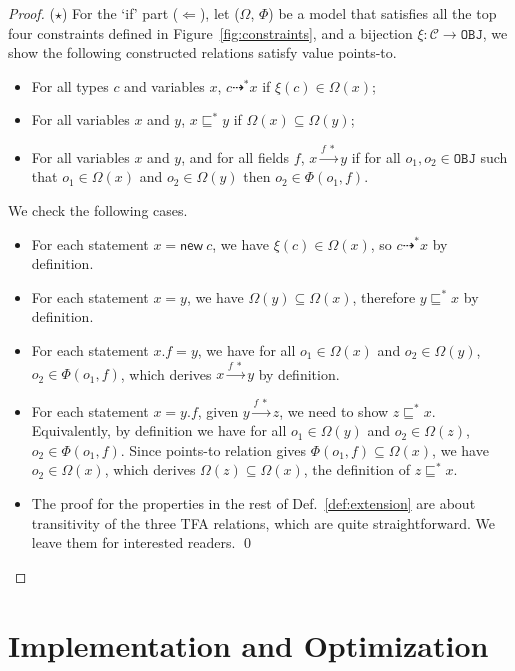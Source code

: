 \documentclass{llncs}
\newcommand{\keyword}[1]{\mathsf{#1}}
\newcommand{\kwnew}[0]{\keyword{new}}
\newcommand\Obj{\mathtt{OBJ}}
\newcommand{\VPT}{\Omega}
\newcommand{\HPT}{\Phi}
\newcommand{\Class}{\mathcal{C}}
\newcommand{\less}{\sqsubseteq}
\newcommand{\tflow}{\dashrightarrow}
\newcommand{\hflow}{\longrightarrow}
\newcommand{\lhflow}[1]{\stackrel{#1}{\hflow}}
\begin{document}
\begin{proof}
\medskip

($\star$) For the `if' part ($\Leftarrow$), let ($\VPT$, $\HPT$) be a model that satisfies all the top four constraints defined in Figure~\ref{fig:constraints}, and a bijection $\xi:\Class\rightarrow\Obj$, we show the following constructed relations satisfy value points-to.
\begin{itemize}
  \item For all types $c$ and variables $x$, $c\tflow^* x$ if $\xi(c)\in\VPT(x)$;
  \item For all variables $x$ and $y$, $x\less^*y$ if $\VPT(x)\subseteq\VPT(y)$;
  \item For all variables $x$ and $y$, and for all fields $f$, $x\lhflow{f\ *}y$ if for all $o_1,o_2\in\Obj$ such that $o_1\in\VPT(x)$ and $o_2\in\VPT(y)$ then $o_2\in\HPT(o_1,f)$.
\end{itemize}
We check the following cases.
\begin{itemize}
\item For each statement $x = \kwnew\ c$, we have $\xi(c)\in\VPT(x)$, so $c\tflow^* x$ by definition.
\item For each statement $x = y$, we have $\VPT(y)\subseteq\VPT(x)$, therefore $y\less^*x$ by definition.
\item For each statement $x.f = y$, we have for all $o_1\in\VPT(x)$ and $o_2\in\VPT(y)$, $o_2\in\HPT(o_1,f)$, which derives $x\lhflow{f\ *}y$ by definition.
\item  For each statement $x = y.f$, given $y\lhflow{f\ *}z$, we need to show $z\less^* x$. Equivalently, by definition we have for all $o_1\in\VPT(y)$ and $o_2\in\VPT(z)$, $o_2\in\HPT(o_1,f)$. Since points-to relation gives $\HPT(o_1,f)\subseteq\VPT(x)$, we have $o_2\in\VPT(x)$, which derives $\VPT(z)\subseteq\VPT(x)$, the definition of $z\less^* x$.
\item The proof for the properties in the rest of Def.~\ref{def:extension} are about transitivity of the three TFA relations, which are quite straightforward. We leave them for interested readers. \qed
\end{itemize}
\end{proof}



\section{Implementation and Optimization}\label{sec:minimization}
\end{document}
